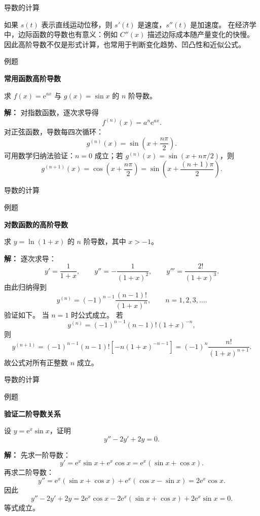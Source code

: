 \documentclass[aspectratio=169,10pt,fontset=fandol]{ctexbeamer}
\newcommand{\ee}{\mathrm{e}}
\begin{document}
\begin{frame}[t,fragile]{导数的计算}
\small
{\small
如果 $s(t)$ 表示直线运动位移，则 $s'(t)$ 是速度，$s''(t)$ 是加速度。 在经济学中，边际函数的导数也有意义：例如 $C''(x)$ 描述边际成本随产量变化的快慢。 因此高阶导数不仅是形式计算，也常用于判断变化趋势、凹凸性和近似公式。


}
\begin{block}{例题}
{\small
\textbf{常用函数高阶导数}\par

求 $f(x)=\ee^{ax}$ 与 $g(x)=\sin x$ 的 $n$ 阶导数。

}
\end{block}
\pause
{\small
\textbf{解：}
对指数函数，逐次求导得
\[
f^{(n)}(x)=a^n\ee^{ax}.
\]
对正弦函数，导数每四次循环：
\[
g^{(n)}(x)=\sin\left(x+\frac{n\pi}{2}\right).
\]
可用数学归纳法验证：$n=0$ 成立；若 $g^{(n)}(x)=\sin(x+n\pi/2)$，则
\[
g^{(n+1)}(x)=\cos\left(x+\frac{n\pi}{2}\right)=\sin\left(x+\frac{(n+1)\pi}{2}\right).
\]

}
\end{frame}
\begin{frame}[t,fragile]{导数的计算}
\footnotesize
\begin{block}{例题}
{\footnotesize
\textbf{对数函数的高阶导数}\par

求 $y=\ln(1+x)$ 的 $n$ 阶导数，其中 $x>-1$。

}
\end{block}
\pause
{\footnotesize
\textbf{解：}
逐次求导：
\[
y'=\frac1{1+x},\qquad
y''=-\frac1{(1+x)^2},\qquad
y'''=\frac{2!}{(1+x)^3}.
\]
由此归纳得到
\[
y^{(n)}=(-1)^{n-1}\frac{(n-1)!}{(1+x)^n},\qquad n=1,2,3,\ldots.
\]
验证如下。 当 $n=1$ 时公式成立。 若
\[
y^{(n)}=(-1)^{n-1}(n-1)!(1+x)^{-n},
\]
则
\[
y^{(n+1)}
=(-1)^{n-1}(n-1)![-n(1+x)^{-n-1}]
=(-1)^n\frac{n!}{(1+x)^{n+1}}.
\]
故公式对所有正整数 $n$ 成立。

}
\end{frame}
\begin{frame}[t,fragile]{导数的计算}
\normalsize
\begin{block}{例题}
{\normalsize
\textbf{验证二阶导数关系}\par

设 $y=\ee^x\sin x$，证明
\[
y''-2y'+2y=0.
\]

}
\end{block}
\pause
{\normalsize
\textbf{解：}
先求一阶导数：
\[
y'=\ee^x\sin x+\ee^x\cos x=\ee^x(\sin x+\cos x).
\]
再求二阶导数：
\[
y''=\ee^x(\sin x+\cos x)+\ee^x(\cos x-\sin x)=2\ee^x\cos x.
\]
因此
\[
y''-2y'+2y
=2\ee^x\cos x-2\ee^x(\sin x+\cos x)+2\ee^x\sin x=0.
\]
等式成立。

}
\end{frame}
\end{document}
